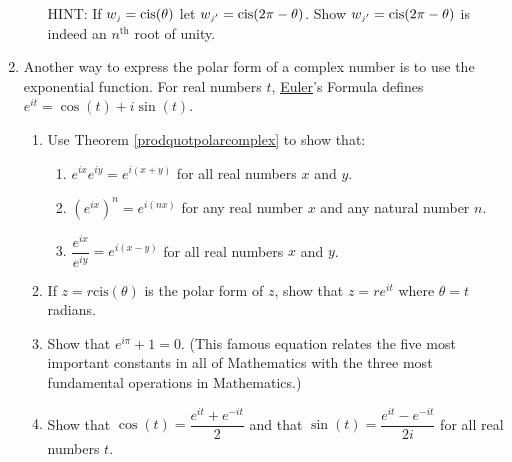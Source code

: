 \documentclass{ximera}
\begin{document}
\begin{enumerate}
\begin{enumerate}
 HINT: If $w_{\text{\tiny$j$}} = \text{cis}(\theta)$ let $w_{\text{\tiny$j'$}} = \text{cis}(2\pi - \theta)$. Show $w_{\text{\tiny$j'$}} = \text{cis}(2\pi - \theta)$ is indeed an $n^{\text{th}}$ root of unity.

\end{enumerate}

\item \label{eulerformulaexercise} Another way to express the polar form of a complex number is to use the exponential function.  For real numbers $t$, \href{http://en.wikipedia.org/wiki/Leonhard_Euler}{\underline{Euler}}'s Formula defines $e^{it} = \cos(t) + i \sin(t)$.  

\begin{enumerate}

\item Use Theorem \ref{prodquotpolarcomplex} to show that:

\begin{enumerate}

\item  $e^{ix} e^{iy} = e^{i(x+y)}$ for all real numbers $x$ and $y$.

\item  $\left(e^{ix}\right)^{n} = e^{i(nx)}$ for any real number $x$ and any natural number $n$.

\item $\dfrac{e^{ix}}{e^{iy}} = e^{i(x-y)}$ for all real numbers $x$ and $y$.

\end{enumerate}



\item If $z = r\text{cis}(\theta)$ is the polar form of $z$, show that $z = re^{it}$ where $\theta = t$ radians.

\item Show that $e^{i\pi} + 1 = 0$.  (This famous equation relates the five most important constants in all of Mathematics with the three most fundamental operations in Mathematics.)

\item  \label{expformcosandsin} Show that $\cos(t) = \dfrac{e^{it} + e^{-it}}{2}$ and that $\sin(t) = \dfrac{e^{it} - e^{-it}}{2i}$ for all real numbers $t$. 

\end{enumerate}

\end{enumerate}

\newpage
\end{document}
